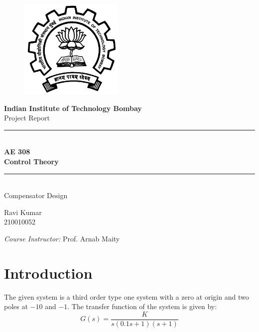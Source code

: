 \documentclass[12pt]{article}
\begin{document}
\begin{figure}
    \centering
    \includegraphics[width=5cm]{iitb-logo.png}
\end{figure}

\begin{center}
    \textbf{\LARGE Indian Institute of Technology Bombay} \\
    \vspace{1cm}
    \Large Project Report\\
    \vspace{0.3cm}

    \rule{\linewidth}{0.5pt} \\
    \vspace{0.2cm}
    \textbf{\LARGE AE 308 \\ \vspace{0.3cm} Control Theory} \\
    \vspace{0.1cm}
    \rule{\linewidth}{0.5pt} \\
    \vspace{1.5cm}
    \LARGE Compensator Design\\

    \vspace{2cm}

    \normalsize Ravi Kumar \\
    210010052

    \vspace{3cm}

    \normalsize\textit{Course Instructor:}\vspace{0.2cm}
    Prof. Arnab Maity

    \vspace{1cm}
    \date{}
\end{center}

\newpage

\section{Introduction}
The given system is a third order type one system with a zero at origin and two
poles at $-10$ and $-1$. The transfer function of the system is given by:
$$G(s) = \dfrac{K}{s(0.1s+1)(s+1)}$$
\end{document}
